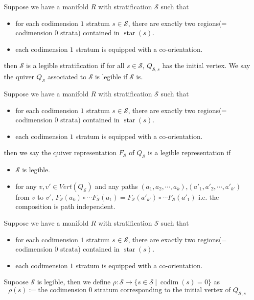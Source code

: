 \begin{definition}
Suppose we have a manifold $R$ with stratification $\mathcal{S}$ such that
\begin{itemize}
\item for each codimension $1$ stratum $s\in \mathcal{S}$, there are exactly two regions(= codimension $0$ strata) contained in $\operatorname{star}(s)$.

\item each codimension $1$ stratum is equipped with a co-orientation.
\end{itemize}
then $\mathcal{S}$ is a legible stratification if for all $s\in\mathcal{S}$, $Q_{\mathcal{S},s}$ has the initial vertex. We say the quiver $Q_{\mathcal{S}}$ associated to $\mathcal{S}$ is legible if $\mathcal{S}$ is.
\end{definition}

\begin{definition}
Suppose we have a manifold $R$ with stratification $\mathcal{S}$ such that
\begin{itemize}
\item for each codimension $1$ stratum $s\in \mathcal{S}$, there are exactly two regions(= codimension $0$ strata) contained in $\operatorname{star}(s)$.

\item each codimension $1$ stratum is equipped with a co-orientation.
\end{itemize}
then we say the quiver representation $F_{\mathcal{S}}$ of $Q_{\mathcal{S}}$ is a legible representation if
\begin{itemize}
\item $\mathcal{S}$ is legible.

\item for any $v,v' \in Vert(Q_{\mathcal{S}})$ and any paths $(a_1,a_2,\cdots,a_k)$,$(a'_1,a'_2,\cdots,a'_{k'})$ from $v$ to $v'$, $F_{\mathcal{S}}(a_k)\circ \cdots F_{\mathcal{S}}(a_1) = F_{\mathcal{S}}(a'_{k'})\circ \cdots F_{\mathcal{S}}(a'_1) $ i.e. the composition is path independent.
\end{itemize}
\end{definition}

\begin{definition}
Suppose we have a manifold $R$ with stratification $\mathcal{S}$ such that
\begin{itemize}
\item for each codimension $1$ stratum $s\in \mathcal{S}$, there are exactly two regions(= codimension $0$ strata) contained in $\operatorname{star}(s)$.

\item each codimension $1$ stratum is equipped with a co-orientation.
\end{itemize}
Supoose $\mathcal{S}$ is legible, then we define $\rho:\mathcal{S}\rightarrow \{s\in \mathcal{S} ~|~ \operatorname{codim}(s)=0 \}$ as
\[
\rho(s):=\text{the codimension $0$ stratum corresponding to the initial vertex of $Q_{\mathcal{S},s}$}
\]
\end{definition}

